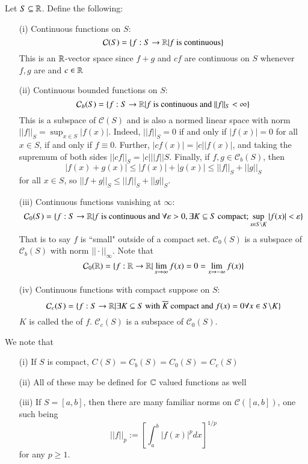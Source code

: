 \begin{eg}
    Let $S \subseteq \mathbb R$. Define the following: \begin{itemize}
        \item[(i)] Continuous functions on $S$: $$\mathcal{C}(S) = \left\{f:S\rightarrow \mathbb R\vert f\text{ is continuous}\right\}$$ This is an $\mathbb R$-vector space since $f+g$ and $cf$ are continuous on $S$ whenever $f,g$ are and $c \in \mathbb R$
        \item[(ii)] Continuous bounded functions on $S$: $$\mathcal{C}_b(S) = \{f:S\rightarrow \mathbb R\vert f\text{ is continuous and }||f||_S < \infty\}$$ This is a subspace of $\mathcal{C}(S)$ and is also a normed linear space with norm $||f||_S = \sup_{x\in S}|f(x)|$. Indeed, $||f||_S = 0$ if and only if $|f(x)| = 0$ for all $x \in S$, if and only if $f \equiv 0$. Further, $|cf(x)| = |c||f(x)|$, and taking the supremum of both sides $||cf||_S = |c|||f||S$. Finally, if $f,g \in \mathcal{C}_b(S)$, then $$|f(x) + g(x)| \leq |f(x)| + |g(x)| \leq ||f||_S+||g||_S$$ for all $x \in S$, so $||f+g||_S \leq ||f||_S + ||g||_S$.
        \item[(iii)] Continuous functions vanishing at $\infty$: $$\mathcal{C}_0(S) = \{f:S\rightarrow \mathbb R\vert f\text{ is continuous and }\forall \varepsilon > 0,\exists K \subseteq S\text{ compact}; \sup_{x\in S\backslash K}|f(x)| < \varepsilon\}$$ That is to say $f$ is ``small" outside of a compact set. $\mathcal{C}_0(S)$ is a subspace of $\mathcal{C}_b(S)$ with norm $||\cdot||_{\infty}$. Note that $$\mathcal{C}_0(\mathbb R) = \{f:\mathbb R\rightarrow \mathbb R\vert\lim\limits_{x\rightarrow \infty}f(x) = 0 = \lim\limits_{x\rightarrow -\infty}f(x)\}$$
        \item[(iv)] Continuous functions with compact suppose on $S$: $$\mathcal{C}_c(S) = \{f:S\rightarrow \mathbb R\vert \exists K \subseteq S\text{ with }\overline{K}\text{ compact and }f(x) = 0\forall x \in S\backslash K\}$$ $K$ is called the  of $f$. $\mathcal{C}_c(S)$ is a subspace of $\mathcal{C}_0(S)$.
    \end{itemize}
\end{eg}

\begin{rmk}
    We note that \begin{itemize}
        \item[(i)] If $S$ is compact, $C(S) = C_b(S) = C_0(S) = C_c(S)$
        \item[(ii)] All of these may be defined for $\mathbb C$ valued functions as well
        \item[(iii)] If $S = [a,b]$, then there are many familiar norms on $\mathcal{C}([a,b])$, one such being $$||f||_p := \left[\int_a^b|f(x)|^pdx\right]^{1/p}$$ for any $p\geq 1$.
    \end{itemize}
\end{rmk}

